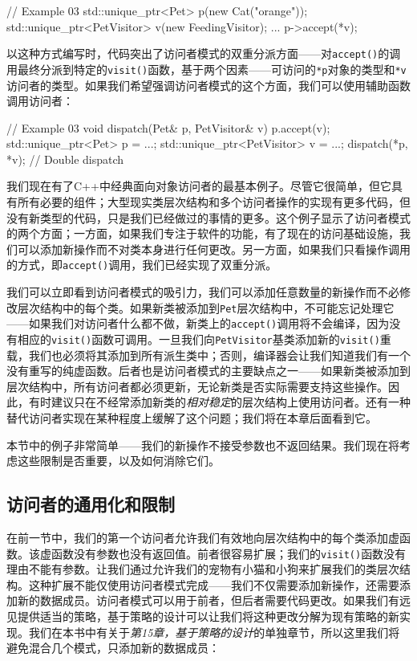 \begin{code}
// Example 03
std::unique_ptr<Pet> p(new Cat("orange"));
std::unique_ptr<PetVisitor> v(new FeedingVisitor);
...
p->accept(*v);
\end{code}

以这种方式编写时，代码突出了访问者模式的双重分派方面——对\texttt{accept()}的调用最终分派到特定的\texttt{visit()}函数，基于两个因素——可访问的\texttt{*p}对象的类型和\texttt{*v}访问者的类型。如果我们希望强调访问者模式的这个方面，我们可以使用辅助函数调用访问者：

\begin{code}
// Example 03
void dispatch(Pet& p, PetVisitor& v) { p.accept(v); }
std::unique_ptr<Pet> p = ...;
std::unique_ptr<PetVisitor> v = ...;
dispatch(*p, *v); // Double dispatch
\end{code}

我们现在有了C++中经典面向对象访问者的最基本例子。尽管它很简单，但它具有所有必要的组件；大型现实类层次结构和多个访问者操作的实现有更多代码，但没有新类型的代码，只是我们已经做过的事情的更多。这个例子显示了访问者模式的两个方面；一方面，如果我们专注于软件的功能，有了现在的访问基础设施，我们可以添加新操作而不对类本身进行任何更改。另一方面，如果我们只看操作调用的方式，即\texttt{accept()}调用，我们已经实现了双重分派。

我们可以立即看到访问者模式的吸引力，我们可以添加任意数量的新操作而不必修改层次结构中的每个类。如果新类被添加到\texttt{Pet}层次结构中，不可能忘记处理它——如果我们对访问者什么都不做，新类上的\texttt{accept()}调用将不会编译，因为没有相应的\texttt{visit()}函数可调用。一旦我们向\texttt{PetVisitor}基类添加新的\texttt{visit()}重载，我们也必须将其添加到所有派生类中；否则，编译器会让我们知道我们有一个没有重写的纯虚函数。后者也是访问者模式的主要缺点之一——如果新类被添加到层次结构中，所有访问者都必须更新，无论新类是否实际需要支持这些操作。因此，有时建议只在不经常添加新类的\emph{相对稳定}的层次结构上使用访问者。还有一种替代访问者实现在某种程度上缓解了这个问题；我们将在本章后面看到它。

本节中的例子非常简单——我们的新操作不接受参数也不返回结果。我们现在将考虑这些限制是否重要，以及如何消除它们。

\subsection{访问者的通用化和限制}

在前一节中，我们的第一个访问者允许我们有效地向层次结构中的每个类添加虚函数。该虚函数没有参数也没有返回值。前者很容易扩展；我们的\texttt{visit()}函数没有理由不能有参数。让我们通过允许我们的宠物有小猫和小狗来扩展我们的类层次结构。这种扩展不能仅使用访问者模式完成——我们不仅需要添加新操作，还需要添加新的数据成员。访问者模式可以用于前者，但后者需要代码更改。如果我们有远见提供适当的策略，基于策略的设计可以让我们将这种更改分解为现有策略的新实现。我们在本书中有关于\emph{第15章，基于策略的设计}的单独章节，所以这里我们将避免混合几个模式，只添加新的数据成员：

